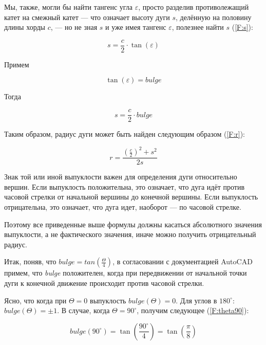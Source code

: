 Мы, также, могли бы найти тангенс угла $\varepsilon$, просто разделив противолежащий катет на смежный катет --- что означает высоту дуги $s$, делённую на половину длины хорды $c$, --- но не зная $s$ и уже имея тангенс $\varepsilon$, полезнее найти $s$ (\ref{F:s}):

\begin{equation}
	s=\frac{c}{2}\cdot\tan(\varepsilon)
	\label{F:s}
\end{equation}

Примем

\begin{equation}
	\tan(\varepsilon)=bulge
	\label{F:tanepsilon}
\end{equation}

Тогда

\begin{equation}
	s=\frac{c}{2}\cdot bulge
	\label{F:sfinal}
\end{equation}

Таким образом, радиус дуги может быть найден следующим образом (\ref{F:r}):

\begin{equation}
	r=\frac{(\frac{c}{2})^2+s^2}{2s}
	\label{F:r}
\end{equation}

Знак той или иной выпуклости важен для определения дуги относительно вершин. Если выпуклость положительна, это означает, что дуга идёт против часовой стрелки от начальной вершины до конечной вершины. Если выпуклость отрицательна, это означает, что дуга идет, наоборот --- по часовой стрелке.

Поэтому все приведенные выше формулы должны касаться абсолютного значения выпуклости, а не фактического значения, иначе можно получить отрицательный радиус.

Итак, поняв, что $bulge = tan(\frac{\Theta}{4})$, в согласовании с документацией AutoCAD \cite{autocad2012dxf} примем, что \textit{bulge} положителен, когда при передвижении от начальной точки дуги к конечной движение происходит против часовой стрелки.

Ясно, что когда при $\Theta=0$ выпуклость $bulge(\Theta)=0$. Для углов в $180^{\circ}$: $bulge(\Theta)=\pm1$. В случае, когда $\Theta=90^{\circ}$, получим следующее (\ref{F:theta90}):

\begin{equation}
	bulge(90^{\circ})= \tan(\frac{90^{\circ}}{4})=\tan(\frac{\pi}{8})
	\label{F:theta90}
\end{equation}

